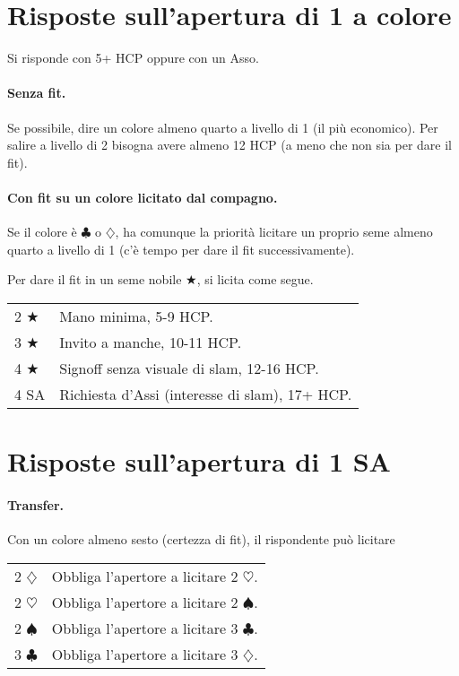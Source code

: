 \documentclass[a4paper,10pt]{article}
\renewcommand{\c}{$\clubsuit$\xspace}
\renewcommand{\d}{$\diamondsuit$\xspace}
\newcommand{\h}{$\heartsuit$\xspace}
\newcommand{\s}{$\spadesuit$\xspace}
\renewcommand{\j}{$\bigstar$\xspace}
\newcommand{\sa}{SA\xspace}
\newcommand{\smallspace}{\vskip0.3cm}
\newenvironment{twocol}
  {\smallspace\noindent\begin{tabular}{l p{0.78\textwidth}}}
  {\end{tabular}\smallspace}
\begin{document}
\section{Risposte sull'apertura di 1 a colore}

Si risponde con 5+ HCP oppure con un Asso.

\paragraph{Senza fit.} Se possibile, dire un colore almeno quarto a livello di 1 (il più economico). Per salire a livello di 2 bisogna avere almeno 12 HCP (a meno che non sia per dare il fit).

\paragraph{Con fit su un colore licitato dal compagno.} Se il colore è \c o \d, ha comunque la priorità licitare un proprio seme almeno quarto a livello di 1 (c'è tempo per dare il fit successivamente).

Per dare il fit in un seme nobile \j, si licita come segue.

\begin{twocol}
	2 \j & Mano minima, 5-9 HCP.\\
	3 \j & Invito a manche, 10-11 HCP.\\
	4 \j & Signoff senza visuale di slam, 12-16 HCP.\\
	4 \sa & Richiesta d'Assi (interesse di slam), 17+ HCP.
\end{twocol}

\pagebreak

\section{Risposte sull'apertura di 1 \sa}

\paragraph{Transfer.} Con un colore almeno sesto (certezza di fit), il rispondente può licitare

\begin{twocol}
 2 \d & Obbliga l'apertore a licitare 2 \h.\\
 2 \h & Obbliga l'apertore a licitare 2 \s.\\
 2 \s & Obbliga l'apertore a licitare 3 \c.\\
 3 \c & Obbliga l'apertore a licitare 3 \d.\\
\end{twocol}
\end{document}
